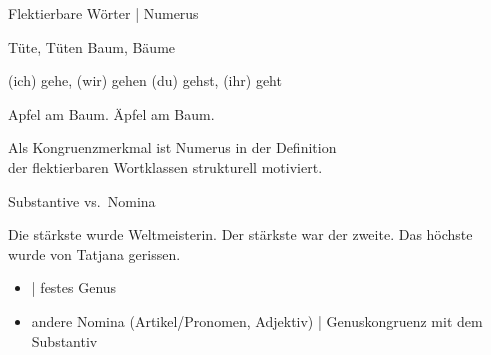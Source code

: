 \begin{frame}
  {Flektierbare Wörter | Numerus}
  \pause
  \begin{exe}
    \ex
    \begin{xlist}
      \ex Tüte, Tüten
      \pause
      \ex Baum, Bäume
    \end{xlist}
    \pause
    \ex
    \begin{xlist}
      \ex (ich) gehe, (wir) gehen
      \pause
      \ex (du) gehst, (ihr) geht
    \end{xlist}
    \Zeile
    \pause
    \ex
    \begin{xlist}
      \ex {}  \alert<8->{Apfel}  am Baum.
      \pause
      \ex {} \alert<10->{Äpfel}  am Baum.
    \end{xlist}
  \end{exe}
  \Zeile
  \pause
  \pause
  \pause
  \pause
  \pause
  \pause
  \pause
  \pause
  Als \alert{Kongruenzmerkmal} ist Numerus in der Definition\\
  der flektierbaren Wortklassen \alert{strukturell motiviert}.
\end{frame}

\begin{frame}
  {Substantive vs.\ Nomina}
  \pause
  \begin{exe}
    \ex \alert<5->{Die stärkste}  wurde Weltmeisterin.
    \pause
    \ex \alert<5->{Der stärkste}  war der zweite.
    \pause
    \ex \alert<5->{Das höchste}  wurde von Tatjana gerissen.
  \end{exe}
  \Zeile
  \pause
  \pause
  \begin{itemize}[<+->]
    \item {} | festes Genus
    \item \alert{andere Nomina} (Artikel\slash Pronomen, Adjektiv) | Genuskongruenz mit dem Substantiv
  \end{itemize}
\end{frame}

